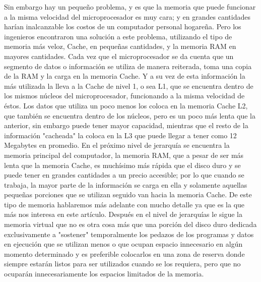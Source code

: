 \documentclass{article}
\begin{document}
Sin embargo hay un pequeño problema, y es que la memoria que puede funcionar a la misma
velocidad del microprocesador es muy cara; y en grandes cantidades harían inalcanzable los
costos de un computador personal hogareña.
Pero los ingenieros encontraron una solución a este problema, utilizando el tipo de memoria
más veloz, Cache, en pequeñas cantidades, y la memoria RAM en mayores cantidades. Cada vez
que el microprocesador se da cuenta que un segmento de datos o información se utiliza de
manera reiterada, toma una copia de la RAM y la carga en la memoria Cache. Y a su vez de esta información la más utilizada la lleva a la Cache de nivel 1, o sea L1, que se encuentra dentro de
los mismos núcleos del microprocesador, funcionando a la misma velocidad de éstos. Los datos
que utiliza un poco menos los coloca en la memoria Cache L2, que también se encuentra dentro
de los núcleos, pero es un poco más lenta que la anterior, sin embargo puede tener mayor
capacidad, mientras que el resto de la información "cacheada" la coloca en la L3 que puede
llegar a tener como 12 Megabytes en promedio.
En el próximo nivel de jerarquía se encuentra la memoria principal del computador, la memoria
RAM, que a pesar de ser más lenta que la memoria Cache, es muchísimo más rápida que el disco
duro y se puede tener en grandes cantidades a un precio accesible; por lo que cuando se trabaja,
la mayor parte de la información se carga en ella y solamente aquellas pequeñas porciones que
se utilizan seguido van hacia la memoria Cache. De este tipo de memoria hablaremos más
adelante con mucho detalle ya que es la que más nos interesa en este artículo.
Después en el nivel de jerarquías le sigue la memoria virtual que no es otra cosa más que una
porción del disco duro dedicada exclusivamente a "sostener" temporalmente los pedazos de los
programas y datos en ejecución que se utilizan menos o que ocupan espacio innecesario en
algún momento determinado y es preferible colocarlos en una zona de reserva donde siempre
estarán listos para ser utilizados cuando se los requiera, pero que no ocuparán
innecesariamente los espacios limitados de la memoria.
\end{document}
